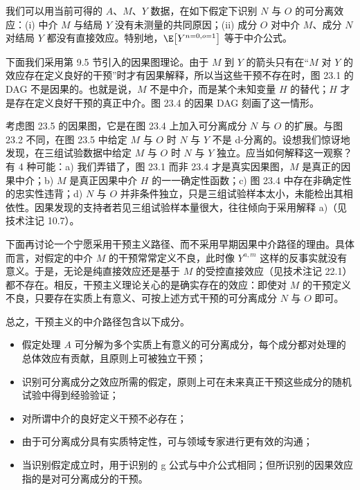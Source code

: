 我们可以用当前可得的 $A$、$M$、$Y$ 数据，在如下假定下识别 $N$ 与 $O$ 的可分离效应：(i) 中介 $M$ 与结局 $Y$ 没有未测量的共同原因；(ii) 成分 $O$ 对中介 $M$、成分 $N$ 对结局 $Y$ 都没有直接效应。特别地，$\E\big[Y^{n=0,o=1}\big]$ 等于中介公式。

\begin{finepoint}[中介为替代变量时的可分离效应]
\setlength{\parindent}{2em}
下面我们采用第 9.5 节引入的因果图理论。由于 $M$ 到 $Y$ 的箭头只有在“$M$ 对 $Y$ 的效应存在定义良好的干预”时才有因果解释，所以当这些干预不存在时，图 23.1 的 DAG 不是因果的。也就是说，$M$ 不是中介，而是某个未知变量 $H$ 的替代；$H$ 才是存在定义良好干预的真正中介。图 23.4 的因果 DAG 刻画了这一情形。

考虑图 23.5 的因果图，它是在图 23.4 上加入可分离成分 $N$ 与 $O$ 的扩展。与图 23.2 不同，在图 23.5 中给定 $M$ 与 $O$ 时 $N$ 与 $Y$ 不是 d-分离的。设想我们惊讶地发现，在三组试验数据中给定 $M$ 与 $O$ 时 $N$ 与 $Y$ 独立。应当如何解释这一观察？有 4 种可能：a) 我们弄错了，图 23.1 而非 23.4 才是真实因果图，$M$ 是真正的因果中介；b) $M$ 是真正因果中介 $H$ 的一一确定性函数；c) 图 23.4 中存在非确定性的忠实性违背；d) $N$ 与 $O$ 并非条件独立，只是三组试验样本太小，未能检出其相依性。因果发现的支持者若见三组试验样本量很大，往往倾向于采用解释 a)（见技术注记 10.7）。
\end{finepoint}

下面再讨论一个宁愿采用干预主义路径、而不采用早期因果中介路径的理由。具体而言，对假定的中介 $M$ 的干预常常定义不良，此时像 $Y^{a,m}$ 这样的反事实就没有意义。于是，无论是纯直接效应还是基于 $M$ 的受控直接效应（见技术注记 22.1）都不存在。相反，干预主义理论关心的是确实存在的效应：即使对 $M$ 的干预定义不良，只要存在实质上有意义、可按上述方式干预的可分离成分 $N$ 与 $O$ 即可。

总之，干预主义的中介路径包含以下成分。

\begin{itemize}
\item 假定处理 $A$ 可分解为多个实质上有意义的可分离成分，每个成分都对处理的总体效应有贡献，且原则上可被独立干预；
\item 识别可分离成分之效应所需的假定，原则上可在未来真正干预这些成分的随机试验中得到经验验证；
\item 对所谓中介的良好定义干预不必存在；
\item 由于可分离成分具有实质特定性，可与领域专家进行更有效的沟通；
\item 当识别假定成立时，用于识别的 g 公式与中介公式相同；但所识别的因果效应指的是对可分离成分的干预。
\end{itemize}

